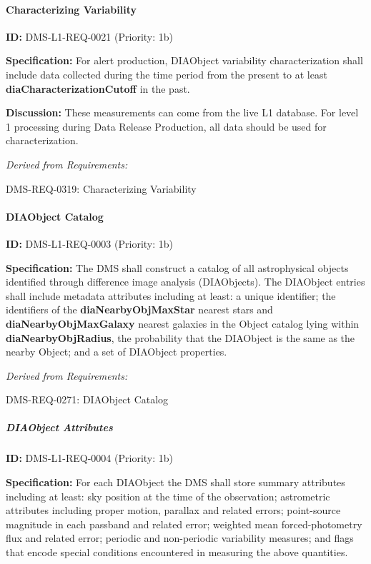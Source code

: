 \documentclass[SE,toc,lsstdraft]{lsstdoc}
\begin{document}
\paragraph{Characterizing Variability}\hfill  %

\label{DMS-L1-REQ-0021}
\textbf{ID:} DMS-L1-REQ-0021 (Priority: 1b)

\textbf{Specification:} For alert production, DIAObject variability characterization shall include data collected during the time period from the present to at least \textbf{diaCharacterizationCutoff} in the past.

\textbf{Discussion:} These measurements can come from the live L1 database. For level 1 processing during Data Release Production, all data should be used for characterization.

\emph{Derived from Requirements:}

DMS-REQ-0319:
Characterizing Variability \newline

\paragraph{DIAObject Catalog}\hfill  %

\label{DMS-L1-REQ-0003}
\textbf{ID:} DMS-L1-REQ-0003 (Priority: 1b)

\textbf{Specification:} The DMS shall construct a catalog of all astrophysical objects identified through difference image analysis (DIAObjects). The DIAObject entries shall include metadata attributes including at least: a unique identifier; the identifiers of the\textbf{ diaNearbyObjMaxStar} nearest stars and \textbf{diaNearbyObjMaxGalaxy} nearest galaxies in the Object catalog lying within \textbf{diaNearbyObjRadius}, the probability that the DIAObject is the same as the nearby Object; and a set of DIAObject properties.

\emph{Derived from Requirements:}

DMS-REQ-0271:
DIAObject Catalog \newline

\subparagraph{DIAObject Attributes}\hfill  %

\label{DMS-L1-REQ-0004}
\textbf{ID:} DMS-L1-REQ-0004 (Priority: 1b)

\textbf{Specification:} For each DIAObject the DMS shall store summary attributes including at least: sky position at the time of the observation; astrometric attributes including proper motion, parallax and related errors; point-source magnitude in each passband and related error; weighted mean forced-photometry flux and related error; periodic and non-periodic variability measures; and flags that encode special conditions encountered in measuring the above quantities.
\end{document}
